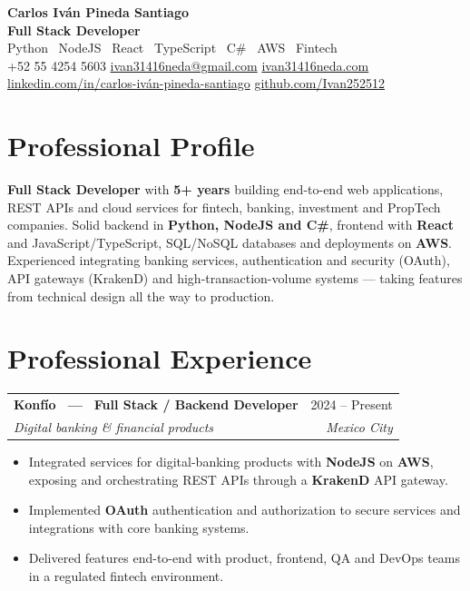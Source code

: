 \documentclass[11pt,a4paper]{article}
\makeatletter
\newcommand{\cventry}[4]{%
  \begin{tabularx}{\linewidth}{@{}X r@{}}
    \textbf{#1} & {\color{muted}#2}\\[2pt]
    {\color{muted}\itshape #3} & {\color{muted}\itshape #4}\\
  \end{tabularx}%
  \vspace{-0.05em}%
}
\newcommand{\sep}{\hspace{0.4em}\textcolor{muted}{\textbullet}\hspace{0.4em}}
\makeatother
\begin{document}
\begin{center}
  {\Huge\bfseries\color{ink} Carlos Iván Pineda Santiago}\\[3pt]
  {\large\color{accent}\bfseries Full Stack Developer}\\[3pt]
  {\color{muted} Python \textperiodcentered\ NodeJS \textperiodcentered\ React \textperiodcentered\ TypeScript \textperiodcentered\ C\# \textperiodcentered\ AWS \textperiodcentered\ Fintech}\\[7pt]
  \small
  +52 55 4254 5603 \sep
  \href{mailto:ivan31416neda@gmail.com}{ivan31416neda@gmail.com} \sep
  \href{https://ivan31416neda.com}{ivan31416neda.com}\\[3pt]
  \href{https://www.linkedin.com/in/carlos-iván-pineda-santiago-325346107/}{linkedin.com/in/carlos-iván-pineda-santiago} \sep
  \href{https://github.com/Ivan252512}{github.com/Ivan252512}
\end{center}

\section{Professional Profile}
\textbf{Full Stack Developer} with \textbf{5+ years} building end-to-end web applications, REST APIs and cloud services for fintech, banking, investment and PropTech companies. Solid backend in \textbf{Python, NodeJS and C\#}, frontend with \textbf{React} and JavaScript/TypeScript, SQL/NoSQL databases and deployments on \textbf{AWS}. Experienced integrating banking services, authentication and security (OAuth), API gateways (KrakenD) and high-transaction-volume systems — taking features from technical design all the way to production.

\section{Professional Experience}

\cventry{Konfío \, — \, Full Stack / Backend Developer}{2024 -- Present}{Digital banking \& financial products}{Mexico City}
\begin{itemize}
  \item Integrated services for digital-banking products with \textbf{NodeJS} on \textbf{AWS}, exposing and orchestrating REST APIs through a \textbf{KrakenD} API gateway.
  \item Implemented \textbf{OAuth} authentication and authorization to secure services and integrations with core banking systems.
  \item Delivered features end-to-end with product, frontend, QA and DevOps teams in a regulated fintech environment.
\end{itemize}
\end{document}
